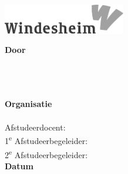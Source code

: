 \documentclass[10pt,a4paper,oneside]{report}
\title{\titel}
\author{\auteur}
\date{\datum}
\begin{document}
\begin{titlepage}
    \begin{adjustwidth*}{-2cm}{-2cm}
    \vspace*{-3.5cm}
    \hspace{12cm}
    \includegraphics[width=0.4\textwidth]{download} \\
    \begin{center}
    \vspace*{1cm}
    {\Huge\thetitle}
    
    \vspace*{0.4cm}
    \textnormal{\ondertitel}
    
    \vspace{5cm}
    \textbf{Door} \\
    \theauthor \\
    \studentklas
    
    \vspace{0.7cm}
    \textbf{\school} \\
    \domein \\
    
    \vspace{0.7cm}
    \textbf{Organisatie} \\
    \organisatie \\

    \vspace{0.7cm}
    Afstudeerdocent: \docent \\
    1\textsuperscript{e} Afstudeerbegeleider: \begeleidereen \\
    2\textsuperscript{e} Afstudeerbegeleider: \begeleidertwee \\

    \vspace{0.7cm}
    \textbf{Datum} \\
    \thedate
    \end{center}
    \end{adjustwidth*}
\end{titlepage}
\end{document}
